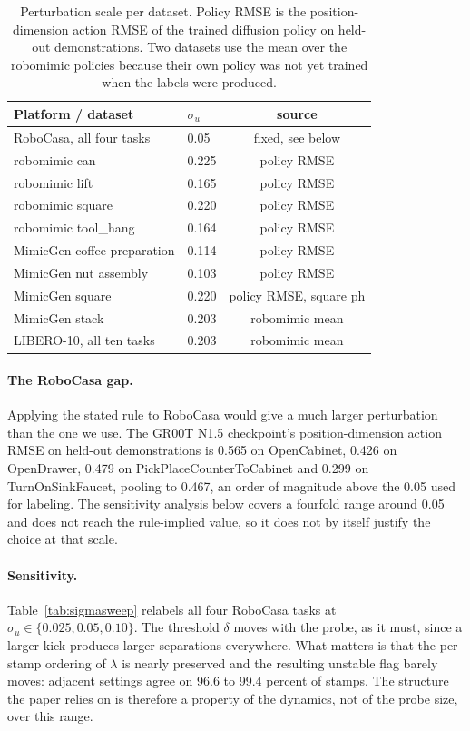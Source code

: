 \begin{table}[h]
\centering
\small
\begin{tabular}{llc}
\toprule
Platform / dataset & $\sigma_u$ & source \\
\midrule
RoboCasa, all four tasks & 0.05 & fixed, see below \\
robomimic can & 0.225 & policy RMSE \\
robomimic lift & 0.165 & policy RMSE \\
robomimic square & 0.220 & policy RMSE \\
robomimic tool\_hang & 0.164 & policy RMSE \\
MimicGen coffee preparation & 0.114 & policy RMSE \\
MimicGen nut assembly & 0.103 & policy RMSE \\
MimicGen square & 0.220 & policy RMSE, square ph \\
MimicGen stack & 0.203 & robomimic mean \\
LIBERO-10, all ten tasks & 0.203 & robomimic mean \\
\bottomrule
\end{tabular}
\caption{Perturbation scale per dataset. Policy RMSE is the position-dimension
action RMSE of the trained diffusion policy on held-out demonstrations. Two
datasets use the mean over the robomimic policies because their own policy was
not yet trained when the labels were produced.}
\label{tab:sigma}
\end{table}

\paragraph{The RoboCasa gap.}
Applying the stated rule to RoboCasa would give a much larger perturbation than
the one we use. The GR00T N1.5 checkpoint's position-dimension action RMSE on
held-out demonstrations is 0.565 on OpenCabinet, 0.426 on OpenDrawer, 0.479 on
PickPlaceCounterToCabinet and 0.299 on TurnOnSinkFaucet, pooling to 0.467, an
order of magnitude above the 0.05 used for labeling. The sensitivity analysis
below covers a fourfold range around 0.05 and does not reach the rule-implied
value, so it does not by itself justify the choice at that scale.

\paragraph{Sensitivity.}
Table~\ref{tab:sigmasweep} relabels all four RoboCasa tasks at
$\sigma_u \in \{0.025, 0.05, 0.10\}$. The threshold $\delta$ moves with the
probe, as it must, since a larger kick produces larger separations everywhere.
What matters is that the per-stamp ordering of $\lambda$ is nearly preserved
and the resulting unstable flag barely moves: adjacent settings agree on 96.6
to 99.4 percent of stamps. The structure the paper relies on is therefore a
property of the dynamics, not of the probe size, over this range.

